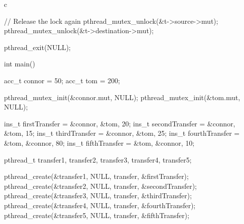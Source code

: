 \begin{code}{c}
{    // Release the lock again
    pthread_mutex_unlock(&t->source->mut);
    pthread_mutex_unlock(&t->destination->mut);

    pthread_exit(NULL);
}

int main() {
    acc_t connor = {50};
    acc_t tom = {200};

    pthread_mutex_init(&connor.mut, NULL);
    pthread_mutex_init(&tom.mut, NULL);

    ins_t firstTransfer = {&connor, &tom, 20};
    ins_t secondTransfer = {&connor, &tom, 15};
    ins_t thirdTransfer = {&connor, &tom, 25};
    ins_t fourthTransfer = {&tom, &connor, 80};
    ins_t fifthTransfer = {&tom, &connor, 10};

    pthread_t transfer1, transfer2, transfer3, transfer4, transfer5;

    pthread_create(&transfer1, NULL, transfer, &firstTransfer);
    pthread_create(&transfer2, NULL, transfer, &secondTransfer);
    pthread_create(&transfer3, NULL, transfer, &thirdTransfer);
    pthread_create(&transfer4, NULL, transfer, &fourthTransfer);
    pthread_create(&transfer5, NULL, transfer, &fifthTransfer);
}

\end{code}

